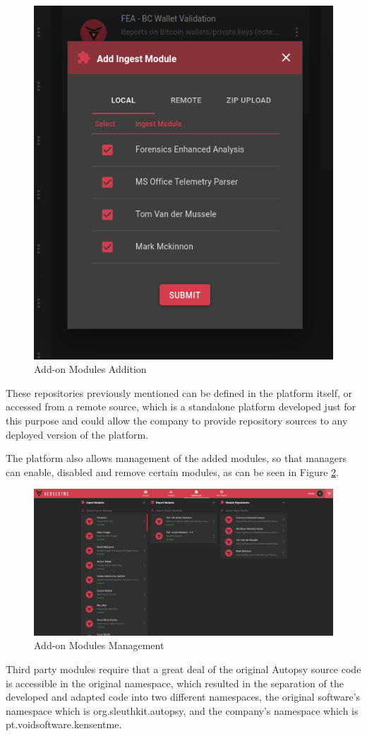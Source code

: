 \begin{figure}[ht]
 \centering
 \includegraphics[width=0.55\linewidth]{imgs/addmodule.png}
 \caption{Add-on Modules Addition}
 \label{fig:addmodule}
\end{figure}

These repositories previously mentioned can be defined in the platform itself, or accessed from a remote source, which is a standalone platform developed just for this purpose and could allow the company to provide repository sources to any deployed version of the platform.

The platform also allows management of the added modules, so that managers can enable, disabled and remove certain modules, as can be seen in Figure \ref{fig:modulesettings}.

\begin{figure}[ht]
 \centering
 \includegraphics[width=1\linewidth]{imgs/modulesettings.png}
 \caption{Add-on Modules Management}
 \label{fig:modulesettings}
\end{figure}

Third party modules require that a great deal of the original Autopsy source code is accessible in the original namespace, which resulted in the separation of the
developed and adapted code into two different namespaces, the original software's namespace which is org.sleuthkit.autopsy, and the company's namespace which is pt.voidsoftware.kensentme. 

